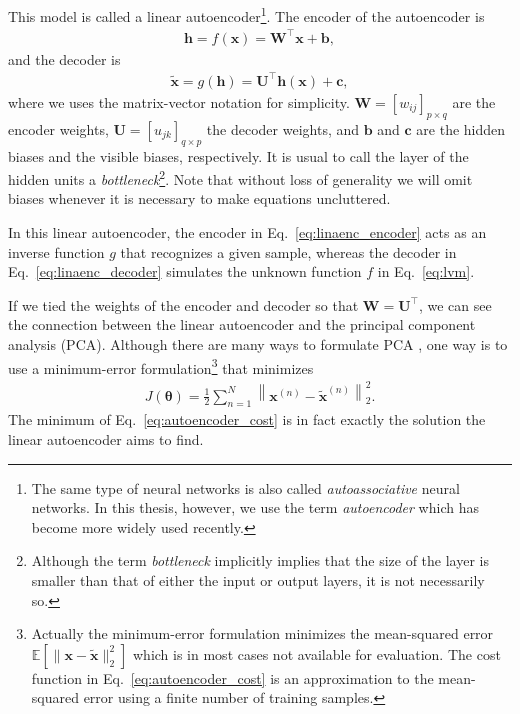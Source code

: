 \documentclass[dissertation,nocontribution,draft*]{aaltoseries}
\newcommand{\vect}[1]{\mathbf{#1}}
\newcommand{\vects}[1]{\boldsymbol{#1}}
\newcommand{\matr}[1]{\mathbf{#1}}
\newcommand{\vb}[0]{\vect{b}}
\newcommand{\vc}[0]{\vect{c}}
\newcommand{\vh}[0]{\vect{h}}
\newcommand{\vx}[0]{\vect{x}}
\newcommand{\mW}[0]{\matr{W}}
\newcommand{\mU}[0]{\matr{U}}
\newcommand{\TT}[0]{{\vects{\theta}}}
\newcommand{\E}[0]{\mathbb{E}}
\begin{document}
This model is called a linear autoencoder\footnote{The same
type of neural networks is also called
\textit{autoassociative} neural networks. In this thesis,
however, we use the term \textit{autoencoder} which has
become more widely used recently.}. The encoder of the
autoencoder is
\begin{align}
    \label{eq:linaenc_encoder}
    \vh = f(\vx) = \mW^\top \vx + \vb,
\end{align}
and the decoder is
\begin{align}
    \label{eq:linaenc_decoder}
    \tilde{\vx} = g(\vh) = \mU^\top \vh(\vx) + \vc,
\end{align}
where we uses the matrix-vector notation for simplicity.
$\mW=\left[ w_{ij} \right]_{p \times q}$ are the encoder weights, $\mU =
\left[ u_{jk} \right]_{q \times p}$ the decoder weights, and
$\vb$ and $\vc$ are 
the hidden biases and the visible biases, respectively. It is usual to
call the layer of the hidden units a
\textit{bottleneck}\footnote{Although the term
\textit{bottleneck} implicitly implies that the size of the layer is
smaller than that of either the input or output layers, it
is not necessarily so.}. Note that without loss of
generality we will omit biases whenever it is necessary to
make equations uncluttered.

In this linear autoencoder, the encoder in
Eq.~\eqref{eq:linaenc_encoder} acts as an inverse function
$g$ that recognizes a given sample, whereas the decoder in
Eq.~\eqref{eq:linaenc_decoder} simulates the unknown
function $f$ in Eq.~\eqref{eq:lvm}.

If we tied the weights of the encoder and decoder so that
$\mW=\mU^\top$, we can see the connection between the linear
autoencoder and the principal component analysis (PCA).
Although there are many ways to formulate PCA \citep[see,
e.g.][]{Bishop2006}, one way is to use a minimum-error
formulation\footnote{
Actually the minimum-error formulation minimizes the
mean-squared error $\E\left[ \| \vx - \tilde{\vx} \|_2^2
\right]$ which is in most cases not available for evaluation. The cost
function in Eq.~\eqref{eq:autoencoder_cost} is an
approximation to the mean-squared error using a finite
number of training samples.
}
that minimizes
\begin{align}
    \label{eq:autoencoder_cost}
    J(\TT) =  \frac{1}{2} \sum_{n=1}^N \left\| \vx^{(n)} -
    \tilde{\vx}^{(n)} \right\|_2^2.
\end{align}
The minimum of Eq.~\eqref{eq:autoencoder_cost} is in fact
exactly the solution the linear autoencoder aims to find.  
\end{document}
